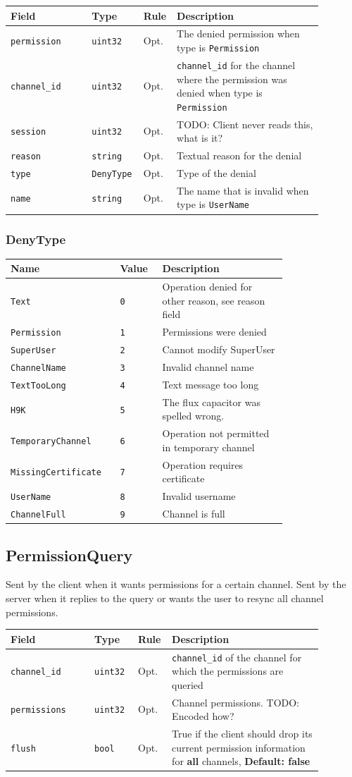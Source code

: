 \documentclass[11pt]{article} %
\newenvironment{mumbleMessageEx}
{%
	\small
	\renewcommand\arraystretch{1.5}
	\begin{tabular}{p{0.25\linewidth}p{0.13\linewidth}p{0.05\linewidth}p{0.45\linewidth}}
	Field & Type & Rule & Description \\
	\hline
}
{%
	\end{tabular}
	\renewcommand\arraystretch{1.0}
}
\newcommand{\mumbleMessageExItem}[4]{ \texttt{#1} & \texttt{#2} & #3 & #4 \\ }
\newenvironment{mumbleEnum}
{%
	\small
	\renewcommand\arraystretch{1.5}
	\begin{tabular}{p{0.25\linewidth}p{0.13\linewidth}p{0.4\linewidth}}
	Name & Value & Description \\
	\hline
}
{%
	\end{tabular}
	\renewcommand\arraystretch{1.0}
}
\newcommand{\mumbleEnumItem}[3]{ \texttt{#1} & \texttt{#2} & #3 \\ }
\begin{document}
\begin{mumbleMessageEx}
\mumbleMessageExItem{permission}{uint32}{Opt.}{The denied permission when type is \texttt{Permission}}
\mumbleMessageExItem{channel\_id}{uint32}{Opt.}{\texttt{channel\_id} for the channel where the permission was denied when type is \texttt{Permission}}
\mumbleMessageExItem{session}{uint32}{Opt.}{TODO: Client never reads this, what is it?}
\mumbleMessageExItem{reason}{string}{Opt.}{Textual reason for the denial}
\mumbleMessageExItem{type}{DenyType}{Opt.}{Type of the denial}
\mumbleMessageExItem{name}{string}{Opt.}{The name that is invalid when type is \texttt{UserName}}
\end{mumbleMessageEx}

\subsubsection{DenyType}
\label{msg:permissionDenied:denyType}

\begin{mumbleEnum}
\mumbleEnumItem{Text}{0}{Operation denied for other reason, see reason field}
\mumbleEnumItem{Permission}{1}{Permissions were denied}
\mumbleEnumItem{SuperUser}{2}{Cannot modify SuperUser}
\mumbleEnumItem{ChannelName}{3}{Invalid channel name}
\mumbleEnumItem{TextTooLong}{4}{Text message too long}
\mumbleEnumItem{H9K}{5}{The flux capacitor was spelled wrong.}
\mumbleEnumItem{TemporaryChannel}{6}{Operation not permitted in temporary channel}
\mumbleEnumItem{MissingCertificate}{7}{Operation requires certificate}
\mumbleEnumItem{UserName}{8}{Invalid username}
\mumbleEnumItem{ChannelFull}{9}{Channel is full}
\end{mumbleEnum}

\subsection{PermissionQuery}

Sent by the client when it wants permissions for a certain channel. Sent by the server when it replies to the query or wants the user to resync all channel permissions.

\begin{mumbleMessageEx}
\mumbleMessageExItem{channel\_id}{uint32}{Opt.}{\texttt{channel\_id} of the channel for which the permissions are queried}
\mumbleMessageExItem{permissions}{uint32}{Opt.}{Channel permissions. TODO: Encoded how?}
\mumbleMessageExItem{flush}{bool}{Opt.}{True if the client should drop its current permission information for \textbf{all} channels, \textbf{Default: false}}
\end{mumbleMessageEx}
\end{document}
